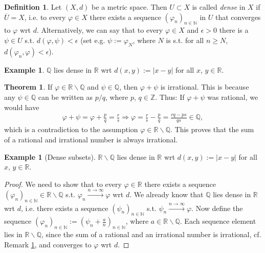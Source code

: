 \documentclass[12pt, a4paper]{article}
\numberwithin{equation}{section}
\theoremstyle{definition}
\theoremstyle{definition}
\newtheorem{defn}[thm]{Definition} %
\newtheorem{exmp}[thm]{Example} %
\newtheorem{theorem}[thm]{Theorem}
\newcommand{\abs}[1]{\left\vert #1 \right\vert}
\newcommand{\seq}[1][\varphi]{\left( #1 \right)_{n \in \mathbb{N}}}
\begin{document}
	\begin{defn}
		Let $(X, d)$ be a metric space. Then $U\subset X$ is called \textit{dense} in $X$ if $\overline{U} = X$, i.e. to every $\varphi\in X$ there exists a sequence $\left(\varphi_n\right)_{n\in\mathbb N}$ in $U$ that converges to $\varphi$ wrt $d$. Alternatively, we can say that to every $\varphi\in X$ and $\epsilon > 0$ there is a $\psi\in U$ s.t. $d(\varphi, \psi) < \epsilon$ (set e.g. $\psi := \varphi_N$, where $N$ is s.t. for all $n\geq N$, $d(\varphi_n, \varphi) < \epsilon$).
	\end{defn}

	\begin{exmp}
		$\mathbb Q$ lies dense in $\mathbb R$ wrt $d(x, y) := \abs{x - y}$ for all $x$, $y\in\mathbb R$.
	\end{exmp}

	\begin{theorem}\label{remark:sum-rational-irrational}
		If $\varphi\in\mathbb R\backslash \mathbb Q$ and $\psi\in\mathbb Q$, then $\varphi + \psi$ is irrational. This is because any $\psi \in \mathbb Q$ can be written as $p/q$, where $p$, $q\in\mathbb Z$. Thus: If $\varphi + \psi$ was rational, we would have
		\begin{align}
			\varphi + \psi = \varphi + \frac{p}{q} = \frac{r}{s} \Rightarrow \varphi = \frac{r}{s} - \frac{p}{q} = \frac{rq - ps}{qs} \in \mathbb Q,
		\end{align}
		which is a contradiction to the assumption $\varphi\in\mathbb R\backslash\mathbb Q$. This proves that the sum of a rational and irrational number is always irrational.
	\end{theorem}

	\begin{exmp}[Dense subsets]
		$\mathbb R\backslash \mathbb Q$ lies dense in $\mathbb R$ wrt $d(x, y) := \abs{x - y}$ for all $x$, $y\in\mathbb R$.
	\end{exmp}

	\begin{proof}
		We need to show that to every $\varphi\in \mathbb R$ there exists a sequence $\left(\varphi_n\right)_{n\in\mathbb N}\in \mathbb R\backslash \mathbb Q$ s.t. $\varphi_n\overset{n\to\infty}{\longrightarrow}\varphi$ wrt $d$. We already know that $\mathbb Q$ lies dense in $\mathbb R$ wrt $d$, i.e. there exists a sequence $\left(\psi_n\right)_{n\in\mathbb N}$ s.t. $\psi_n\overset{n\to\infty}{\longrightarrow}\varphi$. Now define the sequence $\seq[\varphi_n] := \seq[\psi_n + \frac{a}{n}]$, where $a\in\mathbb R\backslash \mathbb Q$. Each sequence element lies in $\mathbb R\backslash \mathbb Q$, since the sum of a rational and an irrational number is irrational, cf. Remark \ref{remark:sum-rational-irrational}, and converges to $\varphi$ wrt $d$.
	\end{proof}
\end{document}
